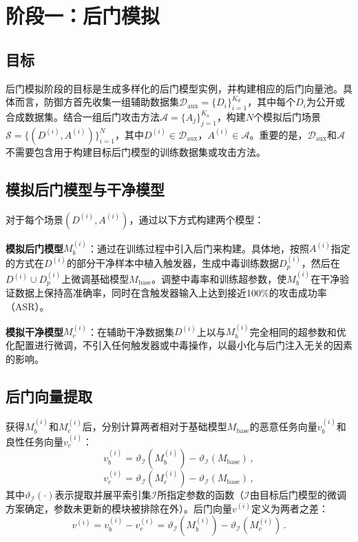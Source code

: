 \section{阶段一：后门模拟}

\subsection{目标}

后门模拟阶段的目标是生成多样化的后门模型实例，并构建相应的后门向量池。具体而言，防御方首先收集一组辅助数据集$\mathcal{D}_{\text{aux}} = \{D_i\}_{i=1}^{K_d}$，其中每个$D_i$为公开或合成数据集。结合一组后门攻击方法$\mathcal{A} = \{A_j\}_{j=1}^{K_a}$，构建$N$个模拟后门场景$\mathcal{S} = \{(D^{(i)}, A^{(i)})\}_{i=1}^{N}$，其中$D^{(i)} \in \mathcal{D}_{\text{aux}}$，$A^{(i)} \in \mathcal{A}$。重要的是，$\mathcal{D}_{\text{aux}}$和$\mathcal{A}$不需要包含用于构建目标后门模型的训练数据集或攻击方法。

\subsection{模拟后门模型与干净模型}

对于每个场景$(D^{(i)}, A^{(i)})$，通过以下方式构建两个模型：

\textbf{模拟后门模型}$M_b^{(i)}$：通过在训练过程中引入后门来构建。具体地，按照$A^{(i)}$指定的方式在$D^{(i)}$的部分干净样本中植入触发器，生成中毒训练数据$D_p^{(i)}$，然后在$D^{(i)} \cup D_p^{(i)}$上微调基础模型$M_{\text{base}}$。调整中毒率和训练超参数，使$M_b^{(i)}$在干净验证数据上保持高准确率，同时在含触发器输入上达到接近100\%的攻击成功率（ASR）。

\textbf{模拟干净模型}$M_c^{(i)}$：在辅助干净数据集$D^{(i)}$上以与$M_b^{(i)}$完全相同的超参数和优化配置进行微调，不引入任何触发器或中毒操作，以最小化与后门注入无关的因素的影响。

\subsection{后门向量提取}

获得$M_b^{(i)}$和$M_c^{(i)}$后，分别计算两者相对于基础模型$M_{\text{base}}$的恶意任务向量$v_b^{(i)}$和良性任务向量$v_c^{(i)}$：
\begin{equation}
v_b^{(i)} = \vartheta_{\mathcal{I}}(M_b^{(i)}) - \vartheta_{\mathcal{I}}(M_{\text{base}}) \, ,
\end{equation}
\begin{equation}
v_c^{(i)} = \vartheta_{\mathcal{I}}(M_c^{(i)}) - \vartheta_{\mathcal{I}}(M_{\text{base}}) \, ,
\end{equation}
其中$\vartheta_{\mathcal{I}}(\cdot)$表示提取并展平索引集$\mathcal{I}$所指定参数的函数（$\mathcal{I}$由目标后门模型的微调方案确定，参数未更新的模块被排除在外）。后门向量$v^{(i)}$定义为两者之差：
\begin{equation}
v^{(i)} = v_b^{(i)} - v_c^{(i)} = \vartheta_{\mathcal{I}}(M_b^{(i)}) - \vartheta_{\mathcal{I}}(M_c^{(i)}) \, .
\end{equation}

